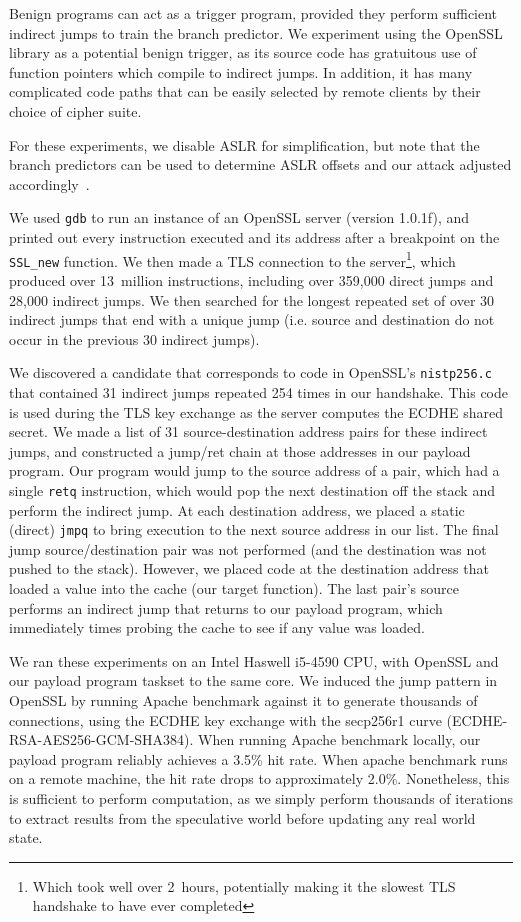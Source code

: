 Benign programs can act as a trigger program, provided they perform sufficient
indirect jumps to train the branch predictor. We experiment using the OpenSSL
library as a potential benign trigger, as its source code has gratuitous use of
function pointers which compile to indirect jumps. In addition, it has many
complicated code paths that can be easily selected by remote clients by their
choice of cipher suite.

For these experiments, we disable ASLR for simplification, but note that the
branch predictors can be used to determine ASLR offsets and our attack adjusted
accordingly~\cite{evtyushkin2016jump}.

We used \texttt{gdb} to run an instance of an OpenSSL server (version 1.0.1f),
and printed out every instruction executed and its address after a breakpoint on
the \texttt{SSL\_new} function. We then made a TLS connection to the
server\footnote{Which took well over 2~hours, potentially making it the slowest
TLS handshake to have ever completed},
which produced over 13~million instructions, including over 359,000 direct jumps
and 28,000 indirect jumps. We then searched for the longest repeated set of over
30 indirect jumps that end with a unique jump (i.e. source and destination do
not occur in the previous 30 indirect jumps).

We discovered a candidate that corresponds to code in OpenSSL's
\texttt{nistp256.c} that contained 31 indirect jumps repeated 254 times in our
handshake. This code is used during the TLS key exchange as the server computes
the ECDHE shared secret. We made a list of 31 source-destination address pairs
for these indirect jumps, and constructed a jump/ret chain at those addresses in
our payload program. Our program would jump to the source address of a pair,
which had a single \texttt{retq} instruction, which would pop the next
destination off the stack and perform the indirect jump. At each destination
address, we placed a static (direct) \texttt{jmpq} to bring execution to the
next source address in our list. The final jump source/destination pair was not
performed (and the destination was not pushed to the stack). However, we placed
code at the destination address that loaded a value into the cache (our target
function). The last pair's source performs an indirect jump that returns to our
payload program, which immediately times probing the cache to see if any value was
loaded.

We ran these experiments on an Intel Haswell
i5-4590 CPU, with OpenSSL and our payload program taskset to the same core.
We induced the jump pattern in OpenSSL by running Apache benchmark against it to
generate thousands of connections, using the ECDHE key exchange with the
secp256r1 curve (ECDHE-RSA-AES256-GCM-SHA384). When running Apache benchmark locally, our payload program
reliably achieves a 3.5\% hit rate. When apache benchmark runs on a remote
machine, the hit rate drops to approximately 2.0\%. Nonetheless, this is
sufficient to perform computation, as we simply perform thousands of iterations
to extract results from the speculative world before updating any real world state.

